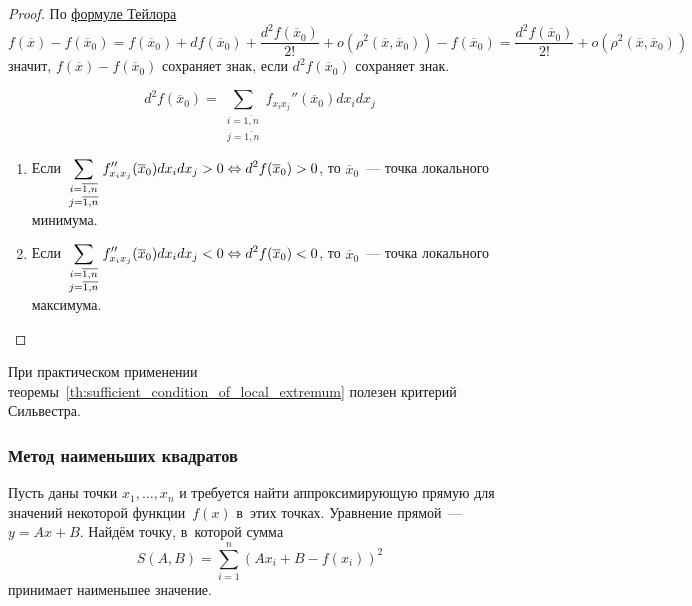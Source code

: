 \begin{proof}
По \hyperref[eq:Taylor_series_for_several_variables]{формуле Тейлора}
\begin{equation*}
f(\overline x) - f(\overline x_0) =
f(\overline x_0) + df(\overline x_0) + \frac{d^2 f(\overline x_0)}{2!} + o(\rho^2(\overline x, \overline x_0)) - f(\overline x_0) =
\frac{d^2 f(\overline x_0)}{2!} + o(\rho^2(\overline x, \overline x_0))
\end{equation*}
значит, $f(\overline x) - f(\overline x_0)$ сохраняет знак, если $d^2 f(\overline x_0)$ сохраняет знак.
	
\begin{equation*}
d^2 f(\overline x_0) = \sum_{
\begin{smallmatrix}
i = \overline{1, n} \\
j = \overline{1, n}
\end{smallmatrix}
} f_{x_i x_j}''(\overline x_0) dx_i dx_j
\end{equation*}
	
\begin{enumerate}
	\item Если $\displaystyle \sum_{
	\begin{smallmatrix}
	i = \overline{1, n} \\
	j = \overline{1, n}
	\end{smallmatrix}
	} f_{x_i x_j}''(\overline x_0) dx_i dx_j > 0 \opbr\Leftrightarrow
	d^2 f(\overline x_0) > 0$, то $\overline x_0$~--- точка локального минимума.
	\item Если $\displaystyle \sum_{
	\begin{smallmatrix}
	i = \overline{1, n} \\
	j = \overline{1, n}
	\end{smallmatrix}
	} f_{x_i x_j}''(\overline x_0) dx_i dx_j < 0 \opbr\Leftrightarrow
	d^2 f(\overline x_0) < 0$, то $\overline x_0$~--- точка локального максимума.
\end{enumerate}
\end{proof}
	
При практическом применении теоремы~\ref*{th:sufficient_condition_of_local_extremum} полезен критерий Сильвестра.
	
\subsubsection{Метод наименьших квадратов}
Пусть даны точки $x_1, \ldots, x_n$ и требуется найти аппроксимирующую прямую для значений некоторой функции~$f(x)$ в~этих точках.
Уравнение прямой~--- $y = Ax + B$.
Найдём точку, в~которой сумма
\begin{equation*}
S(A, B) = \sum_{i=1}^n (A x_i + B - f(x_i))^2
\end{equation*}
принимает наименьшее значение.
	
